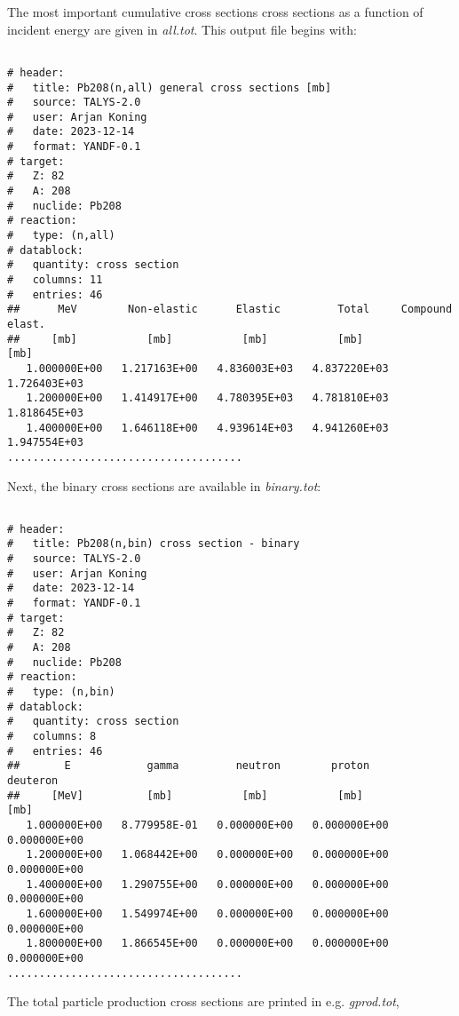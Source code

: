 The most important cumulative cross sections cross sections as a function 
of incident energy are given in {\em all.tot}. This output file begins with:

{\small \begin{verbatim}

# header:
#   title: Pb208(n,all) general cross sections [mb]
#   source: TALYS-2.0
#   user: Arjan Koning
#   date: 2023-12-14
#   format: YANDF-0.1
# target:
#   Z: 82
#   A: 208
#   nuclide: Pb208
# reaction:
#   type: (n,all)
# datablock:
#   quantity: cross section
#   columns: 11
#   entries: 46
##      MeV        Non-elastic      Elastic         Total     Compound elast. 
##     [mb]           [mb]           [mb]           [mb]           [mb]      
   1.000000E+00   1.217163E+00   4.836003E+03   4.837220E+03   1.726403E+03 
   1.200000E+00   1.414917E+00   4.780395E+03   4.781810E+03   1.818645E+03  
   1.400000E+00   1.646118E+00   4.939614E+03   4.941260E+03   1.947554E+03 
.....................................
\end{verbatim} } \renewcommand{\baselinestretch}{1.07}\small\normalsize
\noindent
Next, the binary cross sections are available in {\em binary.tot}:

{\small \begin{verbatim}

# header:
#   title: Pb208(n,bin) cross section - binary
#   source: TALYS-2.0
#   user: Arjan Koning
#   date: 2023-12-14
#   format: YANDF-0.1
# target:
#   Z: 82
#   A: 208
#   nuclide: Pb208
# reaction:
#   type: (n,bin)
# datablock:
#   quantity: cross section
#   columns: 8
#   entries: 46
##       E            gamma         neutron        proton        deuteron  
##     [MeV]          [mb]           [mb]           [mb]           [mb]    
   1.000000E+00   8.779958E-01   0.000000E+00   0.000000E+00   0.000000E+00
   1.200000E+00   1.068442E+00   0.000000E+00   0.000000E+00   0.000000E+00
   1.400000E+00   1.290755E+00   0.000000E+00   0.000000E+00   0.000000E+00
   1.600000E+00   1.549974E+00   0.000000E+00   0.000000E+00   0.000000E+00
   1.800000E+00   1.866545E+00   0.000000E+00   0.000000E+00   0.000000E+00
.....................................
\end{verbatim} } \renewcommand{\baselinestretch}{1.07}\small\normalsize
\noindent
The total particle production cross sections are printed in e.g. {\em gprod.tot},

